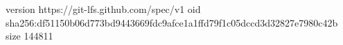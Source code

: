 version https://git-lfs.github.com/spec/v1
oid sha256:df51150b06d773bd9443669fdc9afce1a1ffd79f1c05dccd3d32827e7980c42b
size 144811
